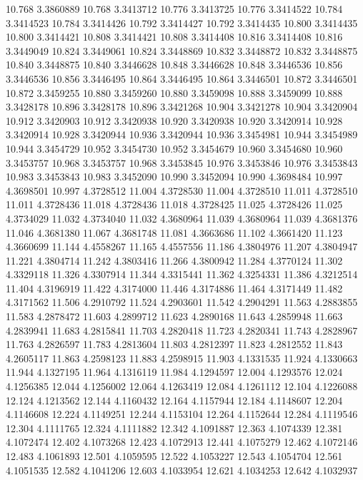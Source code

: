 10.768 3.3860889
10.768 3.3413712
10.776 3.3413725
10.776 3.3414522
10.784 3.3414523
10.784 3.3414426
10.792 3.3414427
10.792 3.3414435
10.800 3.3414435
10.800 3.3414421
10.808 3.3414421
10.808 3.3414408
10.816 3.3414408
10.816 3.3449049
10.824 3.3449061
10.824 3.3448869
10.832 3.3448872
10.832 3.3448875
10.840 3.3448875
10.840 3.3446628
10.848 3.3446628
10.848 3.3446536
10.856 3.3446536
10.856 3.3446495
10.864 3.3446495
10.864 3.3446501
10.872 3.3446501
10.872 3.3459255
10.880 3.3459260
10.880 3.3459098
10.888 3.3459099
10.888 3.3428178
10.896 3.3428178
10.896 3.3421268
10.904 3.3421278
10.904 3.3420904
10.912 3.3420903
10.912 3.3420938
10.920 3.3420938
10.920 3.3420914
10.928 3.3420914
10.928 3.3420944
10.936 3.3420944
10.936 3.3454981
10.944 3.3454989
10.944 3.3454729
10.952 3.3454730
10.952 3.3454679
10.960 3.3454680
10.960 3.3453757
10.968 3.3453757
10.968 3.3453845
10.976 3.3453846
10.976 3.3453843
10.983 3.3453843
10.983 3.3452090
10.990 3.3452094
10.990 4.3698484
10.997 4.3698501
10.997 4.3728512
11.004 4.3728530
11.004 4.3728510
11.011 4.3728510
11.011 4.3728436
11.018 4.3728436
11.018 4.3728425
11.025 4.3728426
11.025 4.3734029
11.032 4.3734040
11.032 4.3680964
11.039 4.3680964
11.039 4.3681376
11.046 4.3681380
11.067 4.3681748
11.081 4.3663686
11.102 4.3661420
11.123 4.3660699
11.144 4.4558267
11.165 4.4557556
11.186 4.3804976
11.207 4.3804947
11.221 4.3804714
11.242 4.3803416
11.266 4.3800942
11.284 4.3770124
11.302 4.3329118
11.326 4.3307914
11.344 4.3315441
11.362 4.3254331
11.386 4.3212514
11.404 4.3196919
11.422 4.3174000
11.446 4.3174886
11.464 4.3171449
11.482 4.3171562
11.506 4.2910792
11.524 4.2903601
11.542 4.2904291
11.563 4.2883855
11.583 4.2878472
11.603 4.2899712
11.623 4.2890168
11.643 4.2859948
11.663 4.2839941
11.683 4.2815841
11.703 4.2820418
11.723 4.2820341
11.743 4.2828967
11.763 4.2826597
11.783 4.2813604
11.803 4.2812397
11.823 4.2812552
11.843 4.2605117
11.863 4.2598123
11.883 4.2598915
11.903 4.1331535
11.924 4.1330663
11.944 4.1327195
11.964 4.1316119
11.984 4.1294597
12.004 4.1293576
12.024 4.1256385
12.044 4.1256002
12.064 4.1263419
12.084 4.1261112
12.104 4.1226088
12.124 4.1213562
12.144 4.1160432
12.164 4.1157944
12.184 4.1148607
12.204 4.1146608
12.224 4.1149251
12.244 4.1153104
12.264 4.1152644
12.284 4.1119546
12.304 4.1111765
12.324 4.1111882
12.342 4.1091887
12.363 4.1074339
12.381 4.1072474
12.402 4.1073268
12.423 4.1072913
12.441 4.1075279
12.462 4.1072146
12.483 4.1061893
12.501 4.1059595
12.522 4.1053227
12.543 4.1054704
12.561 4.1051535
12.582 4.1041206
12.603 4.1033954
12.621 4.1034253
12.642 4.1032937
